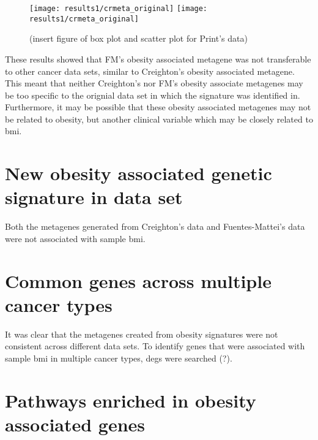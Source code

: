 \begin{figure}[htp!]
	\centering
	\texttt{[image: results1/crmeta\_original]}
	\hfill
	\texttt{[image: results1/crmeta\_original]}
	\caption[FM metagene and sample \gls{bmi}/\gls{bmi} status in Print's data]{(insert figure of box plot and scatter plot for Print's data)}
	\label{fig:fmmetaboxcris1}
\end{figure}

\noindent
These results showed that FM's obesity associated metagene was not transferable to other cancer data sets, similar to Creighton's obesity associated metagene.
This meant that neither Creighton's nor FM's obesity associate metagenes may be too specific to the orignial data set in which the signature was identified in.
Furthermore, it may be possible that these obesity associated metagenes may not be related to obesity, but another clinical variable which may be closely related to \gls{bmi}.

\section{New obesity associated genetic signature in \citet{Creighton2012} data set}
\label{sec:creighton_obesity_metagene_new}

Both the metagenes generated from Creighton's data and Fuentes-Mattei's data were not associated with sample \gls{bmi}.








\section{Common genes across multiple cancer types}
\label{sec:common_genes_across_multiple_cancer_types}

It was clear that the metagenes created from obesity signatures were not consistent across different data sets.
To identify genes that were associated with sample \gls{bmi} in multiple cancer types, \glspl{deg} were searched (?).







\section{Pathways enriched in obesity associated genes}
\label{sec:pathways_enriched_in_obesity_associated_genes}












